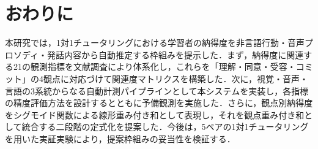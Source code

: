 \documentclass[Japanese]{dicomopapers}
\begin{document}
\section{おわりに}

本研究では，1対1チュータリングにおける学習者の納得度を非言語行動・音声プロソディ・発話内容から自動推定する枠組みを提示した．まず，納得度に関連する21の観測指標を文献調査により体系化し，これらを「理解・同意・受容・コミット」の4観点に対応づけて関連度マトリクスを構築した．次に，視覚・音声・言語の3系統からなる自動計測パイプラインとして本システムを実装し，各指標の精度評価方法を設計するとともに予備観測を実施した．さらに，観点別納得度をシグモイド関数による線形重み付き和として表現し，それを観点重み付き和として統合する二段階の定式化を提案した．今後は，5ペアの1対1チュータリングを用いた実証実験により，提案枠組みの妥当性を検証する．
\end{document}
